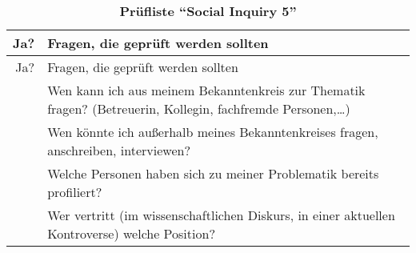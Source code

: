 \documentclass[]{article}
\begin{document}
\begin{longtable}[]{@{}rl@{}}
\caption{\textbf{Prüfliste ``Social Inquiry 5''}}\tabularnewline
\toprule
\begin{minipage}[b]{0.27\columnwidth}\raggedleft\strut
Ja?\strut
\end{minipage} & \begin{minipage}[b]{0.67\columnwidth}\raggedright\strut
Fragen, die geprüft werden sollten\strut
\end{minipage}\tabularnewline
\midrule
\endfirsthead
\toprule
\begin{minipage}[b]{0.27\columnwidth}\raggedleft\strut
Ja?\strut
\end{minipage} & \begin{minipage}[b]{0.67\columnwidth}\raggedright\strut
Fragen, die geprüft werden sollten\strut
\end{minipage}\tabularnewline
\midrule
\endhead
\begin{minipage}[t]{0.27\columnwidth}\raggedleft\strut
\strut
\end{minipage} & \begin{minipage}[t]{0.67\columnwidth}\raggedright\strut
Wen kann ich aus meinem Bekanntenkreis zur Thematik fragen? (Betreuerin,
Kollegin, fachfremde Personen,\ldots{})\strut
\end{minipage}\tabularnewline
\begin{minipage}[t]{0.27\columnwidth}\raggedleft\strut
\strut
\end{minipage} & \begin{minipage}[t]{0.67\columnwidth}\raggedright\strut
Wen könnte ich außerhalb meines Bekanntenkreises fragen, anschreiben,
interviewen?\strut
\end{minipage}\tabularnewline
\begin{minipage}[t]{0.27\columnwidth}\raggedleft\strut
\strut
\end{minipage} & \begin{minipage}[t]{0.67\columnwidth}\raggedright\strut
Welche Personen haben sich zu meiner Problematik bereits
profiliert?\strut
\end{minipage}\tabularnewline
\begin{minipage}[t]{0.27\columnwidth}\raggedleft\strut
\strut
\end{minipage} & \begin{minipage}[t]{0.67\columnwidth}\raggedright\strut
Wer vertritt (im wissenschaftlichen Diskurs, in einer aktuellen
Kontroverse) welche Position?\strut
\end{minipage}\tabularnewline

\end{longtable}
\end{document}
